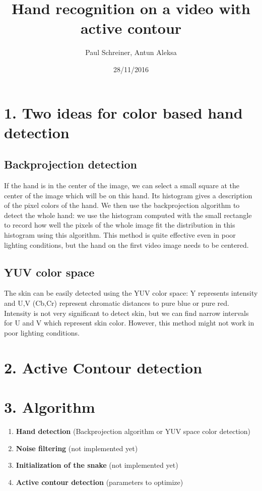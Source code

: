\documentclass{report}
\title{Hand recognition on a video with active contour}
\author{Paul Schreiner, Antun Aleksa}
\date{28/11/2016}
\begin{document}
\maketitle



\section*{1. Two ideas for color based hand detection}

\subsection*{Backprojection detection}

If the hand is in the center of the image, we can select a small square at the center of the image which will be on this hand. Its histogram gives a description of the pixel colors of the hand. We then use the backprojection algorithm to detect the whole hand: we use the histogram computed with the small rectangle to record how well the pixels of the whole image fit the distribution in this histogram using this algorithm. This method is quite effective even in poor lighting conditions, but the hand on the first video image needs to be centered. 

\subsection*{YUV color space}

The skin can be easily detected using the YUV color space: Y represents intensity and U,V (Cb,Cr) represent chromatic distances to pure blue or pure red. Intensity is not very significant to detect skin, but we can find narrow intervals for U and V which represent skin color. However, this method might not work in poor lighting conditions. 



\section*{2. Active Contour detection}

\section*{3. Algorithm}

\begin{enumerate}

\item \textbf{Hand detection} (Backprojection algorithm or YUV space color detection)

\item \textbf{Noise filtering} (not implemented yet)

\item \textbf{Initialization of the snake} (not implemented yet)

\item \textbf{Active contour detection} (parameters to optimize)

\end{enumerate}
\end{document}
